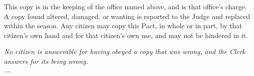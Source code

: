 \begin{center}

\begin{minipage}{3.5in}
\scriptsize
\setlength{\parindent}{0pt}
This copy is in the keeping of the office named above, and is that office's
charge. A copy found altered, damaged, or wanting is reported to the Judge and
replaced within the season. Any citizen may copy this Pact, in whole or in
part, by that citizen's own hand and for that citizen's own use, and may not be
hindered in it.

\vspace{12pt}
{\itshape No citizen is answerable for having obeyed a copy that was wrong, and
the Clerk answers for its being wrong.}\\
--- 
\end{minipage}

\end{center}
\cleardoublepage
